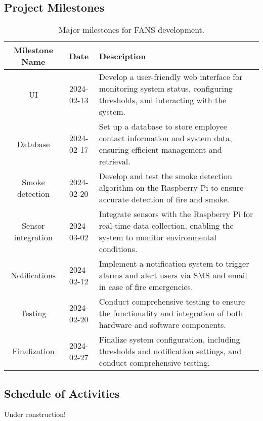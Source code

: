 \subsection{Project Milestones}

\begin{table}[H]
    \centering
    \begin{tabular}{| c | c | p{9cm} |}
        \hline
        \textbf{Milestone Name} & \textbf{Date} & \textbf{Description}                                                                            \\
        \hline
        UI                      & 2024-02-13    & Develop a user-friendly web interface for monitoring system status, configuring thresholds, and
        interacting with the system.                                                                                                              \\
        \hline Database         & 2024-02-17    & Set up a database to store employee contact information
        and system data, ensuring efficient management and retrieval.                                                                             \\
        \hline Smoke detection  & 2024-02-20    & Develop and test
        the smoke detection algorithm on the Raspberry Pi to ensure accurate detection of fire and smoke.                                         \\
        \hline
        Sensor integration      & 2024-03-02    & Integrate sensors with the Raspberry Pi for real-time data collection, enabling the
        system to monitor environmental conditions.                                                                                               \\
        \hline
        Notifications           & 2024-02-12    & Implement a notification system to trigger alarms and alert users via SMS and email
        in case of fire emergencies.                                                                                                              \\
        \hline
        Testing                 & 2024-02-20    & Conduct comprehensive testing to ensure the functionality and integration of both
        hardware and software components.                                                                                                         \\
        \hline
        Finalization            & 2024-02-27    & Finalize system configuration, including thresholds and notification settings, and
        conduct comprehensive testing.                                                                                                            \\
        \hline
    \end{tabular}
    \caption{Major milestones for FANS development.}
\end{table}

\subsection{Schedule of Activities}

Under construction!

